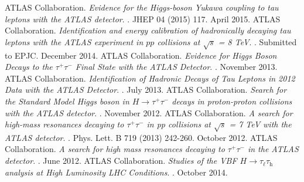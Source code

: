 \documentclass{resume2}
\begin{document}
\begin{resume}
\vspace{-0.8cm}
\renewcommand{\refname}{\selectfont\normalsize}
\begin{thebibliography}{9}
  ATLAS Collaboration.
  \textit{Evidence for the Higgs-boson Yukawa coupling to tau leptons with the ATLAS detector}. 
  \href{http://atlas.web.cern.ch/Atlas/GROUPS/PHYSICS/PAPERS/HIGG-2013-32/}{\underline{}}. 
  JHEP 04 (2015) 117.
  April 2015.
  ATLAS Collaboration.
  \textit{Identification and energy calibration of hadronically decaying tau leptons with the ATLAS experiment in $pp$ collisions at $\sqrt{s}$ = 8 TeV}. 
  \href{http://atlas.web.cern.ch/Atlas/GROUPS/PHYSICS/PAPERS/PERF-2013-06/}{\underline{}}.
  Submitted to EPJC.
  December 2014.
  ATLAS Collaboration.
  \textit{Evidence for Higgs Boson Decays to the $\tau^{+}\tau^{-}$ Final State with the ATLAS Detector}. 
  \href{https://atlas.web.cern.ch/Atlas/GROUPS/PHYSICS/CONFNOTES/ATLAS-CONF-2013-108/}{\underline{}}. 
  November 2013. 
  ATLAS Collaboration.
  \textit{Identification of Hadronic Decays of Tau Leptons in 2012 Data with the ATLAS Detector}. 
  \href{https://atlas.web.cern.ch/Atlas/GROUPS/PHYSICS/CONFNOTES/ATLAS-CONF-2013-064/}{\underline{}}. 
  July 2013. 
  ATLAS Collaboration.
  \textit{Search for the Standard Model Higgs boson in $H\!\rightarrow\!\tau^{+}\tau^{-}$ decays in proton-proton collisions with the ATLAS detector}. 
  \href{https://atlas.web.cern.ch/Atlas/GROUPS/PHYSICS/CONFNOTES/ATLAS-CONF-2012-160/}{\underline{}}. 
  November 2012. 
  ATLAS Collaboration.
  \textit{A search for high-mass resonances decaying to $\tau^{+}\tau^{-}$ in pp collisions at $\sqrt{s}$ = 7 TeV with the ATLAS detector}. 
  \href{https://atlas.web.cern.ch/Atlas/GROUPS/PHYSICS/PAPERS/EXOT-2012-03/}{\underline{}}. 
  Phys. Lett. B 719 (2013) 242-260. 
  October 2012.
  ATLAS Collaboration.
  \textit{A search for high mass resonances decaying to $\tau^{+}\tau^{-}$ in the ATLAS detector}. 
  \href{https://atlas.web.cern.ch/Atlas/GROUPS/PHYSICS/CONFNOTES/ATLAS-CONF-2012-067/}{\underline{}}. 
  June 2012.
  ATLAS Collaboration.
  \textit{Studies of the VBF $\ensuremath{H\rightarrow\tau_\ell\tau_\text{h}}$ analysis at High Luminosity LHC Conditions}.
  \href{https://atlas.web.cern.ch/Atlas/GROUPS/PHYSICS/PUBNOTES/ATL-PHYS-PUB-2014-018/}{\underline{}}. 
  October 2014.
\end{thebibliography}


\end{resume}
\end{document}
